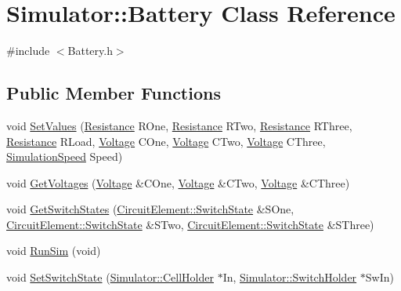 \hypertarget{class_simulator_1_1_battery}{}\section{Simulator\+:\+:Battery Class Reference}
\label{class_simulator_1_1_battery}


{\ttfamily \#include $<$Battery.\+h$>$}

\subsection*{Public Member Functions}
\begin{DoxyCompactItemize}
\item 
void \hyperlink{class_simulator_1_1_battery_a6ab9fa38ad2f83a85ea133dc867c049d}{Set\+Values} (\hyperlink{_resistor_8h_a26699b48da404a64e66bf5db8e1b4ab3}{Resistance} R\+One, \hyperlink{_resistor_8h_a26699b48da404a64e66bf5db8e1b4ab3}{Resistance} R\+Two, \hyperlink{_resistor_8h_a26699b48da404a64e66bf5db8e1b4ab3}{Resistance} R\+Three, \hyperlink{_resistor_8h_a26699b48da404a64e66bf5db8e1b4ab3}{Resistance} R\+Load, \hyperlink{_cell_8h_a4e8e2b518a83ea00ee9e8c1d36fb0852}{Voltage} C\+One, \hyperlink{_cell_8h_a4e8e2b518a83ea00ee9e8c1d36fb0852}{Voltage} C\+Two, \hyperlink{_cell_8h_a4e8e2b518a83ea00ee9e8c1d36fb0852}{Voltage} C\+Three, \hyperlink{_battery_8h_a156fd4498823047a28f4dc75e6f7584f}{Simulation\+Speed} Speed)
\item 
void \hyperlink{class_simulator_1_1_battery_a3d83c60dd8e6ba6a2ce6221a0c523dce}{Get\+Voltages} (\hyperlink{_cell_8h_a4e8e2b518a83ea00ee9e8c1d36fb0852}{Voltage} \&C\+One, \hyperlink{_cell_8h_a4e8e2b518a83ea00ee9e8c1d36fb0852}{Voltage} \&C\+Two, \hyperlink{_cell_8h_a4e8e2b518a83ea00ee9e8c1d36fb0852}{Voltage} \&C\+Three)
\item 
void \hyperlink{class_simulator_1_1_battery_a9aab6fd69096cde04a3a6664a92225ab}{Get\+Switch\+States} (\hyperlink{namespace_simulator_1_1_circuit_element_a6774cddc1f4df8530170b06473f198d1}{Circuit\+Element\+::\+Switch\+State} \&S\+One, \hyperlink{namespace_simulator_1_1_circuit_element_a6774cddc1f4df8530170b06473f198d1}{Circuit\+Element\+::\+Switch\+State} \&S\+Two, \hyperlink{namespace_simulator_1_1_circuit_element_a6774cddc1f4df8530170b06473f198d1}{Circuit\+Element\+::\+Switch\+State} \&S\+Three)
\item 
void \hyperlink{class_simulator_1_1_battery_a10ca059cc7e10be5bd78a76deb1a0494}{Run\+Sim} (void)
\item 
void \hyperlink{class_simulator_1_1_battery_a6edb830c62a82f68d062440fa5acc7b7}{Set\+Switch\+State} (\hyperlink{struct_simulator_1_1_cell_holder}{Simulator\+::\+Cell\+Holder} $\ast$In, \hyperlink{struct_simulator_1_1_switch_holder}{Simulator\+::\+Switch\+Holder} $\ast$Sw\+In)

\end{DoxyCompactItemize}

